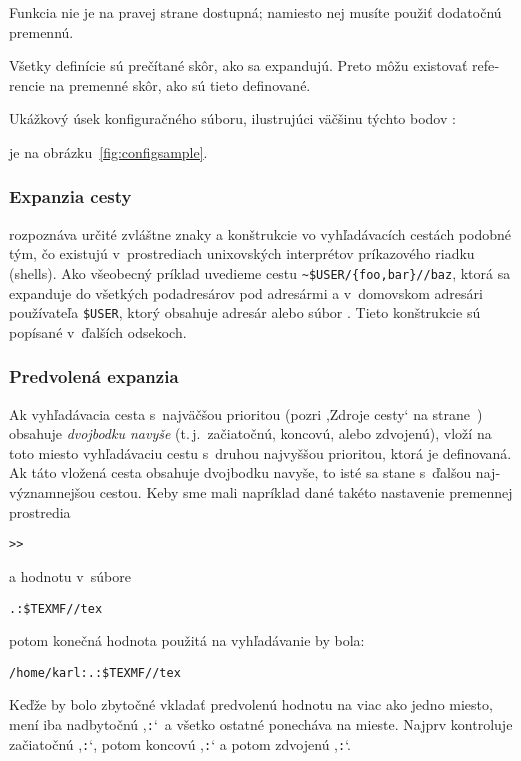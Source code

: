 \documentclass[\classoptions,slovak,english,czech]{\classname}
\newcommand{\singleuv}[1]{,#1`}
\begin{document}
\begin{otherlanguage}{slovak}
\begin{itemize*}
Funkcia  nie je na pravej strane dostupná;
namiesto nej musíte použiť dodatočnú premennú.

\item
  Všetky definície sú prečítané skôr, ako sa expandujú. Preto môžu
  existovať referencie na premenné skôr, ako sú tieto definované.
\end{itemize*}
Ukážkový úsek konfiguračného súboru, ilustrujúci väčšinu
týchto bodov\ifSingleColumn
\ignorespaces:

\else
\space je na obrázku~\ref{fig:configsample}.
\fi

\subsubsection{Expanzia cesty}
\label{sec:pathexpansion}

\KPS{} rozpoznáva určité zvláštne znaky a konštrukcie vo
vyhľadávacích cestách podobné tým, čo existujú v~prostrediach
unixovských interprétov príkazového riadku (shells). Ako všeobecný
príklad uvedieme cestu \verb+~$USER/{foo,bar}//baz+, %
ktorá sa expanduje do všetkých podadresárov pod adresármi
 a 
v~domovskom adresári používateľa \texttt{\$USER}, ktorý  obsahuje
adresár alebo súbor . Tieto konštrukcie sú popísané
v~ďalších odsekoch.
\subsubsection{Predvolená expanzia}
\label{sec:defaultexpansion}

Ak vyhľadávacia cesta s~najväčšou prioritou (pozri \singleuv{Zdroje cesty}
na strane~\pageref{sec:pathsources}) obsahuje \emph{dvojbodku
navyše} (t.\,j.\ začiatočnú, koncovú, alebo zdvojenú), \KPS{} vloží na
toto miesto vyhľadávaciu cestu s~druhou najvyššou prioritou, ktorá
je definovaná. Ak táto vložená cesta obsahuje dvojbodku navyše, to
isté sa stane s~ďalšou najvýznamnejšou cestou. Keby sme mali
napríklad dané takéto nastavenie premennej prostredia
\begin{alltt}
>> 
\end{alltt}
a hodnotu  v~súbore 
\begin{alltt}
  .:\$TEXMF//tex
\end{alltt}
potom konečná hodnota použitá na vyhľadávanie by bola:
\begin{alltt}
  /home/karl:.:\$TEXMF//tex
\end{alltt}
Keďže by bolo zbytočné vkladať predvolenú hodnotu na viac ako jedno
miesto, \KPS{} mení iba nadbytočnú \singleuv{\texttt{:}}\ a všetko ostatné
ponecháva na mieste. Najprv kontroluje začiatočnú \singleuv{\texttt{:}}, potom
koncovú \singleuv{\texttt{:}} a potom zdvojenú \singleuv{\texttt{:}}.


\end{otherlanguage}
\end{document}
